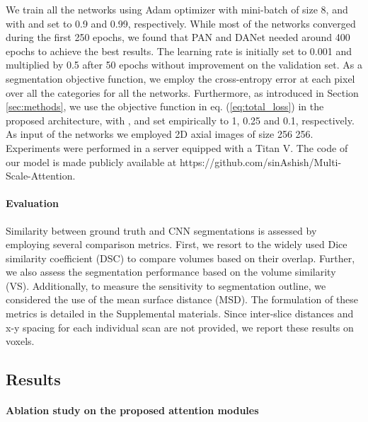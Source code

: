 \documentclass[journal]{IEEEtran}
\begin{document}
We train all the networks using Adam optimizer with mini-batch of size 8, and with  and  set to 0.9 and 0.99, respectively. While most of the networks converged during the first 250 epochs, we found that PAN \cite{li2018pyramid} and DANet \cite{fu2018dual} needed around 400 epochs to achieve the best results. The learning rate is initially set to 0.001 and multiplied by 0.5 after 50 epochs without improvement on the validation set. As a segmentation objective function, we employ the cross-entropy error at each pixel over all the categories for all the networks. Furthermore, as introduced in Section \ref{sec:methods}, we use the objective function in eq. (\ref{eq:total_loss}) in the proposed architecture, with ,  and  set empirically to 1, 0.25 and 0.1, respectively. As input of the networks we employed 2D axial images of size 256  256. Experiments were performed in a server equipped with a Titan V. The code of our model is made publicly available at https://github.com/sinAshish/Multi-Scale-Attention.



\paragraph*{\textbf{Evaluation}}

Similarity between ground truth and CNN segmentations is assessed by employing several comparison metrics. First, we resort to the widely used Dice similarity coefficient (DSC) to compare volumes based on their overlap. Further, we also assess the segmentation performance based on the volume similarity (VS). Additionally, to measure the sensitivity to segmentation outline, we considered the use of the mean surface distance (MSD). The formulation of these metrics is detailed in the Supplemental materials. Since inter-slice distances and x-y spacing for each individual scan are not provided, we report these results on voxels. 


\subsection{\textbf{Results}}

\paragraph*{\textbf{Ablation study on the proposed attention modules}}
\end{document}
